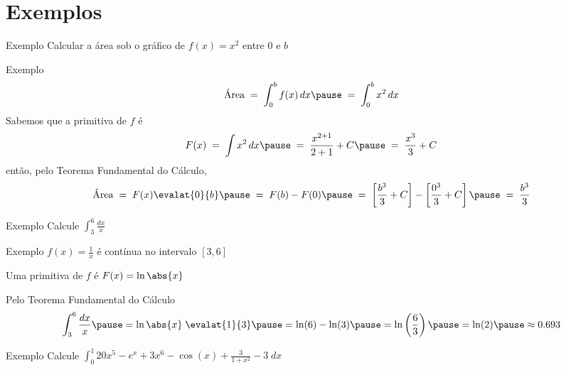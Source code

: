 \section{Exemplos}

\addtocounter{exemplo}{1}
\begin{frame}{Exemplo \theexemplo}
  Calcular a área sob o gráfico de \(f(x)=x^2\) entre 0 e $b$
\end{frame}

\begin{frame}{Exemplo \theexemplo}
  \[
    \text{Área}
    \;=\; \int_0^b f(x) \,dx \pause
    \;=\; \int_0^b x^2  \,dx
  \]
  \pause
  Sabemos que a primitiva de $f$ é
  \[
    F(x)
    \;=\; \int x^2  \,dx \pause
    \;=\; \frac{x^{2+1}}{2+1} + C \pause
    \;=\; \frac{x^3}{3} + C
  \]
  \pause
  então, pelo Teorema Fundamental do Cálculo,
  \[
    \text{Área}
    \;=\; F(x) \evalat{0}{b} \pause
    \;=\; F(b) - F(0)        \pause
    \;=\; \left[ \frac{b^3}{3} + C \right]
    -   \left[ \frac{0^3}{3} + C \right] \pause
    \;=\; \frac{b^3}{3}
  \]
\end{frame}

\addtocounter{exemplo}{1}
\begin{frame}{Exemplo \theexemplo}
  Calcule \(\int_3^6 \frac{dx}{x}\)
\end{frame}

\begin{frame}{Exemplo \theexemplo}
  \(f(x)=\frac{1}{x}\) é contínua no intervalo $[3, 6]$

  \pause
  \vspace{\baselineskip}
  Uma primitiva de $f$ é $F(x)=\ln\abs{x}$

  \pause
  \vspace{\baselineskip}
  Pelo Teorema Fundamental do Cálculo
  \[
    \int_3^6 \frac{dx}{x}
    \pause
    = \ln\abs{x} \;\evalat{1}{3}
    \pause
    = \ln(6) - \ln(3)
    \pause
    = \ln\left(\frac{6}{3}\right)
    \pause
    = \ln(2)
    \pause
    \approx 0.693
  \]
\end{frame}

\addtocounter{exemplo}{1}
\begin{frame}{Exemplo \theexemplo}
  Calcule
  \(
    \int_0^1 20x^5 - e^x + 3x^6 - \cos(x) + \frac{3}{1+x^2} - 3 \; dx
  \)
\end{frame}

